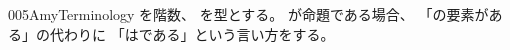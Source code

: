 \documentclass[index]{subfiles}
\begin{document}
\begin{myBlock}{005A}{myTerminology}
  を階数、
  を型とする。
  が命題である場合、
  「の要素がある」の代わりに
  「はである」という言い方をする。
\end{myBlock}
\end{document}
